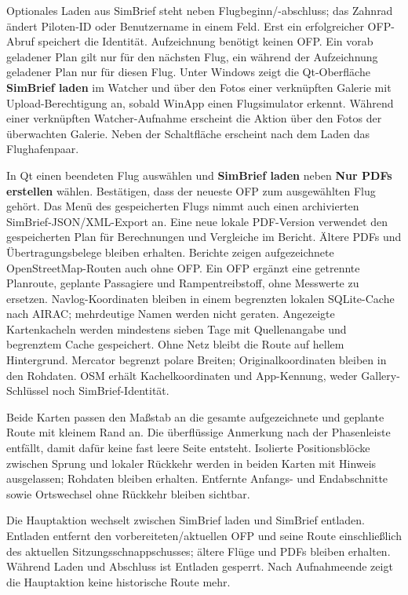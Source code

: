\documentclass[11pt,a4paper]{article}
\newcommand{\ui}[1]{\textbf{#1}}
\begin{document}
Optionales Laden aus SimBrief steht neben Flugbeginn/-abschluss; das Zahnrad
ändert Piloten-ID oder Benutzername in einem Feld. Erst ein erfolgreicher
OFP-Abruf speichert die Identität. Aufzeichnung benötigt keinen OFP. Ein vorab
geladener Plan gilt nur für den nächsten Flug, ein während der Aufzeichnung
geladener Plan nur für diesen Flug. Unter Windows zeigt die Qt-Oberfläche
\ui{SimBrief laden} im Watcher und über den Fotos einer verknüpften Galerie
mit Upload-Berechtigung an, sobald WinApp einen Flugsimulator erkennt.
Während einer verknüpften Watcher-Aufnahme erscheint die Aktion über den
Fotos der überwachten Galerie. Neben der Schaltfläche erscheint nach dem
Laden das Flughafenpaar.

In Qt einen beendeten Flug auswählen und \ui{SimBrief laden} neben
\ui{Nur PDFs erstellen} wählen. Bestätigen, dass der neueste OFP zum
ausgewählten Flug gehört. Das Menü des gespeicherten Flugs nimmt auch einen
archivierten SimBrief-JSON/XML-Export an. Eine neue lokale PDF-Version verwendet
den gespeicherten Plan für Berechnungen und Vergleiche im Bericht. Ältere PDFs
und Übertragungsbelege bleiben erhalten.
Berichte zeigen aufgezeichnete OpenStreetMap-Routen auch ohne OFP. Ein OFP
ergänzt
eine getrennte Planroute, geplante Passagiere und Rampentreibstoff, ohne
Messwerte
zu ersetzen. Navlog-Koordinaten bleiben in einem begrenzten lokalen SQLite-Cache
nach AIRAC; mehrdeutige Namen werden nicht geraten. Angezeigte Kartenkacheln
werden mindestens sieben Tage mit Quellenangabe und begrenztem Cache
gespeichert.
Ohne Netz bleibt die Route auf hellem Hintergrund. Mercator begrenzt polare
Breiten; Originalkoordinaten bleiben in den Rohdaten. OSM erhält
Kachelkoordinaten
und App-Kennung, weder Gallery-Schlüssel noch SimBrief-Identität.

Beide Karten passen den Maßstab an die gesamte aufgezeichnete und geplante
Route mit kleinem Rand an. Die überflüssige Anmerkung nach der Phasenleiste
entfällt, damit dafür keine fast leere Seite entsteht.
Isolierte Positionsblöcke zwischen Sprung und lokaler Rückkehr werden
in beiden Karten mit Hinweis ausgelassen; Rohdaten bleiben erhalten.
Entfernte Anfangs- und Endabschnitte sowie Ortswechsel ohne Rückkehr bleiben
sichtbar.

Die Hauptaktion wechselt zwischen SimBrief laden und SimBrief entladen.
Entladen entfernt den vorbereiteten/aktuellen OFP und seine Route
einschließlich des aktuellen Sitzungsschnappschusses; ältere Flüge und PDFs
bleiben erhalten. Während Laden und Abschluss ist Entladen gesperrt.
Nach Aufnahmeende zeigt die Hauptaktion keine historische Route mehr.
\end{document}
